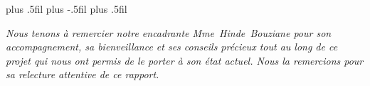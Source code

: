 \clearpage
\thispagestyle{empty}
\vspace*{\fill}

\hfill
\begin{minipage}{.75\textwidth}
    \leftskip=0pt plus .5fil
    \rightskip=0pt plus -.5fil
    \parfillskip=0pt plus .5fil

    \textit{Nous tenons à remercier notre encadrante Mme~Hinde~Bouziane pour son accompagnement, sa bienveillance et ses conseils précieux tout au long de ce projet qui nous ont permis de le porter à son état actuel. Nous la remercions pour sa relecture attentive de ce rapport.}
\end{minipage}
